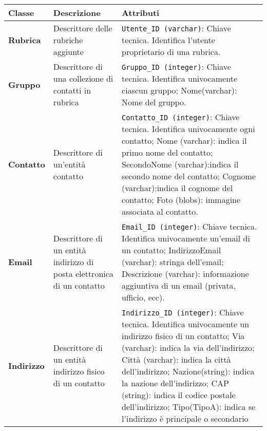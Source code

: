 \begin{longtable}{p{}p{}p{}}
\toprule
Classe & Descrizione & Attributi                                                                                                                         
\\ \midrule
\endhead
\textbf{Rubrica} &
Descrittore delle rubriche aggiunte &
\verb|Utente_ID (varchar)|: Chiave tecnica. Identifica l’utente proprietario di una rubrica. 
\\ \midrule
\textbf{Gruppo} &
Descrittore di una collezione di contatti in rubrica &
\verb|Gruppo_ID (integer)|: Chiave tecnica. Identifica univocamente ciascun gruppo;\newline
Nome(varchar): Nome del gruppo.
\\ \midrule
\textbf{Contatto} &
Descrittore di un'entità contatto &
\verb|Contatto_ID (integer)|: Chiave tecnica. Identifica univocamente ogni contatto;\newline
Nome (varchar): indica il primo nome del contatto;\newline
SecondoNome (varchar):indica il secondo nome del contatto;\newline
Cognome (varchar):indica il cognome del contatto;\newline
Foto (blobs): immagine associata al contatto.
\\ \midrule
\textbf{Email} &
Descrittore di un entità indirizzo di posta elettronica di un contatto &
\verb|Email_ID (integer)|: Chiave tecnica. Identifica univocamente un'email di un contatto;\newline
IndirizzoEmail (varchar): stringa dell'email;\newline
Descrizione (varchar): informazione aggiuntiva di un email (privata, ufficio, ecc).
\\ \midrule
\textbf{Indirizzo} &
Descrittore di un entità indirizzo fisico di un contatto &
\verb|Indirizzo_ID (integer)|: Chiave tecnica. Identifica univocamente un indirizzo fisico di un contatto; \newline
Via (varchar): indica la via dell’indirizzo;\newline
Città (varchar): indica la città dell’indirizzo;\newline
Nazione(string): indica la nazione dell’indirizzo;\newline
CAP (string): indica il codice postale dell'indirizzo;\newline
Tipo(TipoA): indica se l’indirizzo è principale o secondario
\\ \midrule

\end{longtable}
